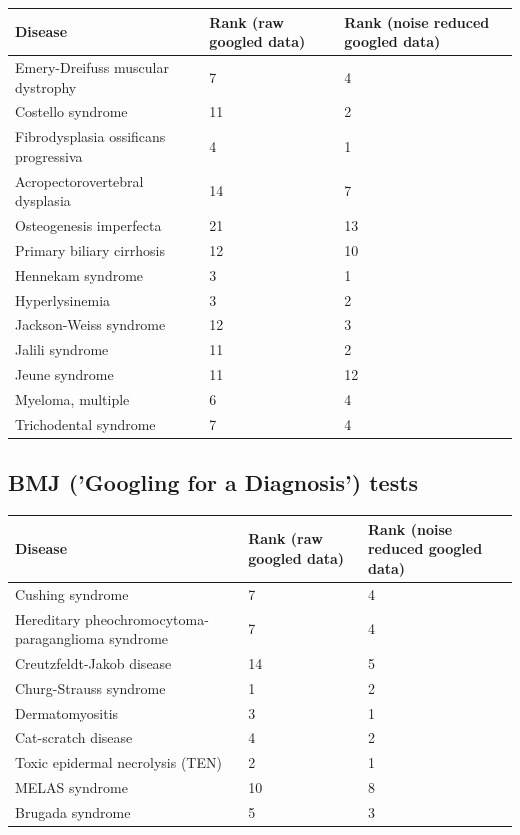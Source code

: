 \documentclass[10pt,letterpaper,final]{article}
\begin{document}
\begin{center}
\begin{small}
\begin{tabular}{|p{3.5cm}|p{1.8cm}|p{1.8cm}|}
	\hline
	\textbf{Disease}  & \textbf{Rank (raw googled data)} & \textbf{Rank (noise reduced googled data)} \\
	\hline\hline
    Emery-Dreifuss muscular dystrophy  & 7 & 4\\    \hline
    Costello syndrome  & 11 & 2\\    \hline
    Fibrodysplasia ossificans progressiva  & 4 & 1\\    \hline
    Acropectorovertebral dysplasia  & 14 & 7\\    \hline
    Osteogenesis imperfecta  & 21 & 13\\    \hline
    Primary biliary cirrhosis  & 12 & 10\\    \hline
    Hennekam syndrome  & 3 & 1\\    \hline
    Hyperlysinemia  & 3 & 2\\    \hline
    Jackson-Weiss syndrome  & 12 & 3\\    \hline
    Jalili syndrome & 11 & 2\\    \hline
    Jeune syndrome & 11 & 12\\    \hline
    Myeloma, multiple  & 6 & 4\\    \hline
    Trichodental syndrome  & 7 & 4\\    \hline
    \end{tabular}
\end{small}
\end{center}

\subsection{BMJ ('Googling for a Diagnosis') tests }

\begin{center}
\begin{small}
	\begin{tabular}{|p{3.5cm}|p{1.8cm}|p{1.8cm}|}
	\hline
	\textbf{Disease}  & \textbf{Rank (raw googled data)} & \textbf{Rank (noise reduced googled data)} \\    \hline\hline
    Cushing syndrome  & 7 &  4\\    \hline
    Hereditary pheochromocytoma-paraganglioma syndrome  & 7 & 4\\    \hline
    Creutzfeldt-Jakob disease  & 14 & 5\\    \hline
    Churg-Strauss syndrome  & 1 & 2\\    \hline
    Dermatomyositis  & 3 & 1\\    \hline
    Cat-scratch disease  & 4 & 2\\    \hline
    Toxic epidermal necrolysis (TEN)  & 2 & 1\\    \hline
    MELAS syndrome  & 10 & 8\\    \hline
    Brugada syndrome  & 5 & 3\\    \hline
	\end{tabular}
\label{tab:results_bmj}
\end{small}
\end{center}
\end{document}
